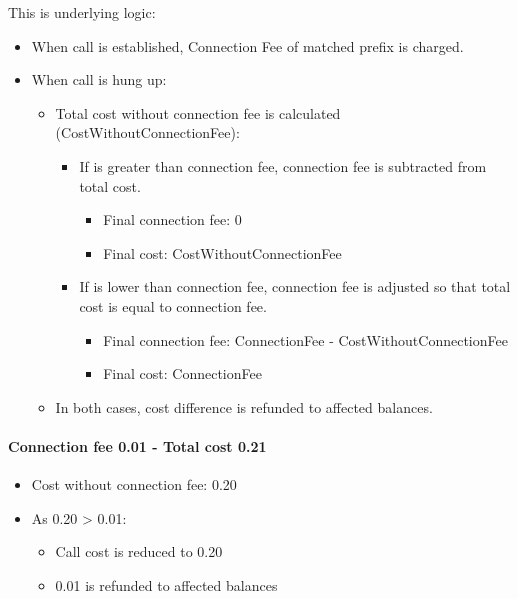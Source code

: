 \documentclass[letterpaper,10pt,spanish]{sphinxmanual}
\begin{document}
This is underlying logic:
\begin{itemize}
\item {} 
When call is established, Connection Fee of matched prefix is charged.

\item {} 
When call is hung up:
\begin{itemize}
\item {} 
Total cost without connection fee is calculated (CostWithoutConnectionFee):
\begin{itemize}
\item {} 
If is greater than connection fee, connection fee is subtracted from total cost.
\begin{itemize}
\item {} 
Final connection fee: 0

\item {} 
Final cost: CostWithoutConnectionFee

\end{itemize}

\item {} 
If is lower than connection fee, connection fee is adjusted so that total cost is equal to connection fee.
\begin{itemize}
\item {} 
Final connection fee: ConnectionFee - CostWithoutConnectionFee

\item {} 
Final cost: ConnectionFee

\end{itemize}

\end{itemize}

\item {} 
In both cases, cost difference is refunded to affected balances.

\end{itemize}

\end{itemize}
\paragraph{Connection fee 0.01 - Total cost 0.21}
\begin{itemize}
\item {} 
Cost without connection fee: 0.20

\item {} 
As 0.20 \textgreater{} 0.01:
\begin{itemize}
\item {} 
Call cost is reduced to 0.20

\item {} 
0.01 is refunded to affected balances

\end{itemize}

\end{itemize}
\end{document}
